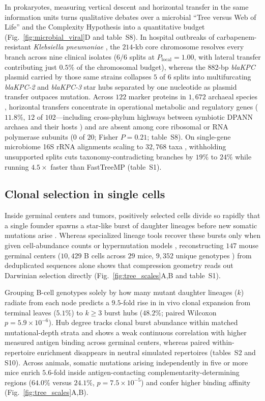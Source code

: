 \documentclass[12pt]{article}
\begin{document}
In prokaryotes, measuring vertical descent and horizontal transfer in the same information units turns qualitative debates over a microbial ``Tree versus Web of Life'' \cite{doolittle1999phylogenetic} and the Complexity Hypothesis \cite{jain1999horizontal} into a quantitative budget (Fig.~\ref{fig:microbial_viral}D and table~S8). In hospital outbreaks of carbapenem-resistant \textit{Klebsiella pneumoniae} \cite{wyres2020population}, the $214$-kb core chromosome resolves every branch across nine clinical isolates ($6/6$ splits at $P_{\mathrm{local}} = 1.00$, with lateral transfer contributing just $0.5\%$ of the chromosomal budget), whereas the $882$-bp \textit{blaKPC} plasmid carried by those same strains collapses $5$ of $6$ splits into multifurcating \textit{blaKPC-2} and \textit{blaKPC-3} star hubs separated by one nucleotide as plasmid transfer outpaces mutation. Across $122$ marker proteins in $1,672$ archaeal species \cite{parks2020gtdb}, horizontal transfers concentrate in operational metabolic and regulatory genes ($11.8\%$, $12$ of $102$---including cross-phylum highways between symbiotic DPANN archaea and their hosts \cite{castelle2018major}) and are absent among core ribosomal or RNA polymerase subunits ($0$ of $20$; Fisher $P = 0.21$; table~S8). On single-gene microbiome 16S rRNA alignments scaling to $32,768$ taxa \cite{mcdonald2012greengenes}, withholding unsupported splits cuts taxonomy-contradicting branches by $19\%$ to $24\%$ while running $4.5\times$ faster than FastTreeMP (table~S1).

\subsection*{Clonal selection in single cells}

Inside germinal centers and tumors, positively selected cells divide so rapidly that a single founder spawns a star-like burst of daughter lineages before new somatic mutations arise \cite{tas2016visualizing}. Whereas specialized lineage tools recover these bursts only when given cell-abundance counts or hypermutation models \cite{dewitt2018gctree}, reconstructing $147$ mouse germinal centers ($10,429$ B cells across $29$ mice, $9,352$ unique genotypes \cite{dewitt2026gcreplay}) from deduplicated sequences alone shows that compression geometry reads out Darwinian selection directly (Fig.~\ref{fig:tree_scales}A,B and table~S1).

Grouping B-cell genotypes solely by how many mutant daughter lineages ($k$) radiate from each node predicts a $9.5$-fold rise in in vivo clonal expansion from terminal leaves ($5.1\%$) to $k \ge 3$ burst hubs ($48.2\%$; paired Wilcoxon $p = 5.9 \times 10^{-6}$). Hub degree tracks clonal burst abundance within matched mutational-depth strata and shows a weak continuous correlation with higher measured antigen binding across germinal centers, whereas paired within-repertoire enrichment disappears in neutral simulated repertoires (tables~S2 and S10). Across animals, somatic mutations arising independently in five or more mice enrich $5.6$-fold inside antigen-contacting complementarity-determining regions ($64.0\%$ versus $24.1\%$, $p = 7.5 \times 10^{-5}$) and confer higher binding affinity (Fig.~\ref{fig:tree_scales}A,B).
\end{document}
